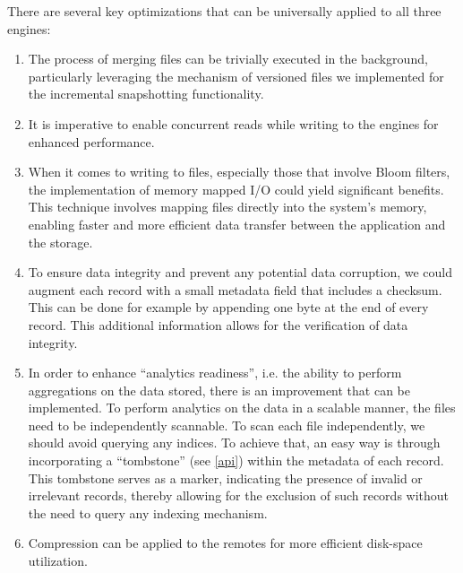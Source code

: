 There are several key optimizations that can be universally applied to all three engines:

\begin{enumerate}
    \item The process of merging files can be trivially executed in the background, particularly leveraging the mechanism of versioned files we implemented for the incremental snapshotting functionality.

    \item It is imperative to enable concurrent reads while writing to the engines for enhanced performance.

    \item When it comes to writing to files, especially those that involve Bloom filters, the implementation of memory mapped I/O could yield significant benefits. This technique involves mapping files directly into the system's memory, enabling faster and more efficient data transfer between the application and the storage.

    \item To ensure data integrity and prevent any potential data corruption, we could augment each record with a small metadata field that includes a checksum. This can be done for example by appending one byte at the end of every record. This additional information allows for the verification of data integrity.

    \item In order to enhance ``analytics readiness'', i.e. the ability to perform aggregations on the data stored, there is an improvement that can be implemented. To perform analytics on the data in a scalable manner, the files need to be independently scannable. To scan each file independently, we should avoid querying any indices. To achieve that, an easy way is through incorporating a ``tombstone'' (see \ref{api}) within the metadata of each record. This tombstone serves as a marker, indicating the presence of invalid or irrelevant records, thereby allowing for the exclusion of such records without the need to query any indexing mechanism.

    \item Compression can be applied to the remotes for more efficient disk-space utilization.
\end{enumerate}
